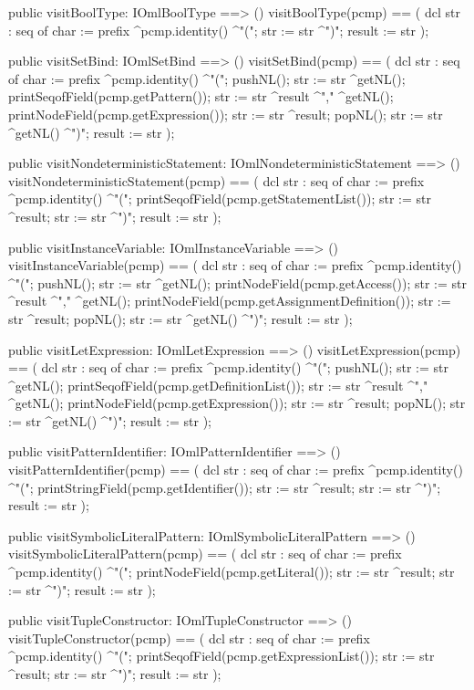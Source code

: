 \begin{vdm_al}
  public visitBoolType: IOmlBoolType ==> ()
  visitBoolType(pcmp) ==
    ( dcl str : seq of char := prefix ^pcmp.identity() ^"(";
      str := str ^")";
      result := str );

  public visitSetBind: IOmlSetBind ==> ()
  visitSetBind(pcmp) ==
    ( dcl str : seq of char := prefix ^pcmp.identity() ^"(";
      pushNL();
      str := str ^getNL();
      printSeqofField(pcmp.getPattern());
      str := str ^result ^"," ^getNL();
      printNodeField(pcmp.getExpression());
      str := str ^result;
      popNL();
      str := str ^getNL() ^")";
      result := str );

  public visitNondeterministicStatement: IOmlNondeterministicStatement ==> ()
  visitNondeterministicStatement(pcmp) ==
    ( dcl str : seq of char := prefix ^pcmp.identity() ^"(";
      printSeqofField(pcmp.getStatementList());
      str := str ^result;
      str := str ^")";
      result := str );

  public visitInstanceVariable: IOmlInstanceVariable ==> ()
  visitInstanceVariable(pcmp) ==
    ( dcl str : seq of char := prefix ^pcmp.identity() ^"(";
      pushNL();
      str := str ^getNL();
      printNodeField(pcmp.getAccess());
      str := str ^result ^"," ^getNL();
      printNodeField(pcmp.getAssignmentDefinition());
      str := str ^result;
      popNL();
      str := str ^getNL() ^")";
      result := str );

  public visitLetExpression: IOmlLetExpression ==> ()
  visitLetExpression(pcmp) ==
    ( dcl str : seq of char := prefix ^pcmp.identity() ^"(";
      pushNL();
      str := str ^getNL();
      printSeqofField(pcmp.getDefinitionList());
      str := str ^result ^"," ^getNL();
      printNodeField(pcmp.getExpression());
      str := str ^result;
      popNL();
      str := str ^getNL() ^")";
      result := str );

  public visitPatternIdentifier: IOmlPatternIdentifier ==> ()
  visitPatternIdentifier(pcmp) ==
    ( dcl str : seq of char := prefix ^pcmp.identity() ^"(";
      printStringField(pcmp.getIdentifier());
      str := str ^result;
      str := str ^")";
      result := str );

  public visitSymbolicLiteralPattern: IOmlSymbolicLiteralPattern ==> ()
  visitSymbolicLiteralPattern(pcmp) ==
    ( dcl str : seq of char := prefix ^pcmp.identity() ^"(";
      printNodeField(pcmp.getLiteral());
      str := str ^result;
      str := str ^")";
      result := str );

  public visitTupleConstructor: IOmlTupleConstructor ==> ()
  visitTupleConstructor(pcmp) ==
    ( dcl str : seq of char := prefix ^pcmp.identity() ^"(";
      printSeqofField(pcmp.getExpressionList());
      str := str ^result;
      str := str ^")";
      result := str );


\end{vdm_al}
